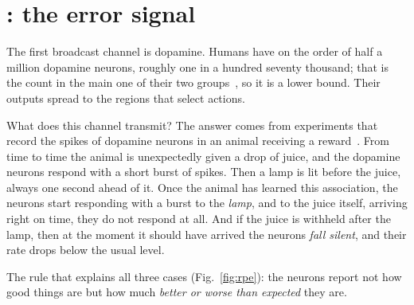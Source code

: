 \section{: the error signal}

The first broadcast channel is dopamine. Humans have on the order of half a million dopamine neurons, roughly one in a hundred seventy thousand; that is the count in the main one of their two groups~\cite{Pakkenberg1991}, so it is a lower bound. Their outputs spread to the regions that select actions.

What does this channel transmit? The answer comes from experiments that record the spikes of dopamine neurons in an animal receiving a reward~\cite{Schultz1997}. From time to time the animal is unexpectedly given a drop of juice, and the dopamine neurons respond with a short burst of spikes. Then a lamp is lit before the juice, always one second ahead of it. Once the animal has learned this association, the neurons start responding with a burst to the \emph{lamp}, and to the juice itself, arriving right on time, they do not respond at all. And if the juice is withheld after the lamp, then at the moment it should have arrived the neurons \emph{fall silent}, and their rate drops below the usual level.

The rule that explains all three cases (Fig.~\ref{fig:rpe}): the neurons report not how good things are but how much \emph{better or worse than expected} they are.

